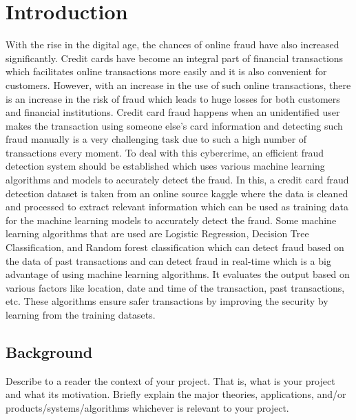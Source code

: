 \chapter{Introduction}
\label{ch:into} %

With the rise in the digital age, the chances of online fraud have also increased significantly. Credit cards have become an integral part of financial transactions which facilitates online transactions more easily and it is also convenient for customers. However, with an increase in the use of such online transactions, there is an increase in the risk of fraud which leads to huge losses for both customers and financial institutions. Credit card fraud happens when an unidentified user makes the transaction using someone else’s card information and detecting such fraud manually is a very challenging task due to such a high number of transactions every moment. To deal with this cybercrime, an efficient fraud detection system \cite{DORNADULA2019631} should be established which uses various machine learning algorithms and models to accurately detect the fraud. In this, a credit card fraud detection dataset  is taken from an online source kaggle where the data is cleaned and processed to extract relevant information which can be used as training data for the machine learning models to accurately detect the fraud. Some machine learning algorithms \cite{refId0} that are used are Logistic Regression, Decision Tree Classification, and Random forest classification which can detect fraud based on the data of past transactions and can detect fraud in real-time which is a big advantage of using machine learning algorithms. It evaluates the output based on various factors like location, date and time of the transaction, past transactions, etc. These algorithms ensure safer transactions by improving the security by learning from the training datasets.  





\section{Background}
\label{sec:into_back}
Describe to a reader the context of your project. That is, what is your project and what its motivation. Briefly explain the major theories, applications, and/or products/systems/algorithms whichever is relevant to your project.

